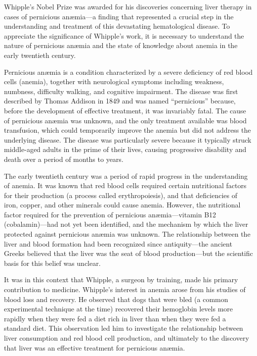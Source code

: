 Whipple's Nobel Prize was awarded for his discoveries concerning liver therapy in cases of pernicious an{\ae}mia---a finding that represented a crucial step in the understanding and treatment of this devastating hematological disease. To appreciate the significance of Whipple's work, it is necessary to understand the nature of pernicious an{\ae}mia and the state of knowledge about anemia in the early twentieth century.

Pernicious an{\ae}mia is a condition characterized by a severe deficiency of red blood cells (anemia), together with neurological symptoms including weakness, numbness, difficulty walking, and cognitive impairment. The disease was first described by Thomas Addison in 1849 and was named ``pernicious'' because, before the development of effective treatment, it was invariably fatal. The cause of pernicious an{\ae}mia was unknown, and the only treatment available was blood transfusion, which could temporarily improve the anemia but did not address the underlying disease. The disease was particularly severe because it typically struck middle-aged adults in the prime of their lives, causing progressive disability and death over a period of months to years.

The early twentieth century was a period of rapid progress in the understanding of anemia. It was known that red blood cells required certain nutritional factors for their production (a process called erythropoiesis), and that deficiencies of iron, copper, and other minerals could cause anemia. However, the nutritional factor required for the prevention of pernicious an{\ae}mia---vitamin B12 (cobalamin)---had not yet been identified, and the mechanism by which the liver protected against pernicious an{\ae}mia was unknown. The relationship between the liver and blood formation had been recognized since antiquity---the ancient Greeks believed that the liver was the seat of blood production---but the scientific basis for this belief was unclear.

It was in this context that Whipple, a surgeon by training, made his primary contribution to medicine. Whipple's interest in anemia arose from his studies of blood loss and recovery. He observed that dogs that were bled (a common experimental technique at the time) recovered their hemoglobin levels more rapidly when they were fed a diet rich in liver than when they were fed a standard diet. This observation led him to investigate the relationship between liver consumption and red blood cell production, and ultimately to the discovery that liver was an effective treatment for pernicious an{\ae}mia.

